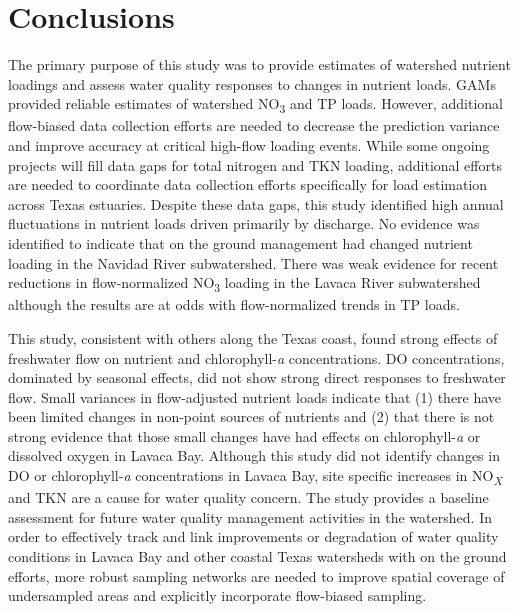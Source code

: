 \documentclass[fleqn,10pt,lineno]{wlpeerj} %
\providecommand{\DIFaddtex}[1]{{\protect\color{blue}\uwave{#1}}} %
\providecommand{\DIFaddbegin}{} %
\providecommand{\DIFaddend}{} %
\providecommand{\DIFadd}[1]{\texorpdfstring{\DIFaddtex{#1}}{#1}} %
\begin{document}
\hypertarget{conclusions}{%
\section*{Conclusions}\label{conclusions}}

The primary purpose of this study was to provide estimates of watershed
nutrient loadings and assess water quality responses to changes in
nutrient loads. GAMs provided reliable estimates of watershed
NO\textsubscript{3} and TP loads. However, additional flow-biased data
collection efforts are needed to decrease the prediction variance and
improve accuracy at critical high-flow loading events. While some
ongoing projects will fill data gaps for total nitrogen and TKN loading,
additional efforts are needed to coordinate data collection efforts
specifically for load estimation across Texas estuaries. Despite these
data gaps, this study identified high annual fluctuations in nutrient
loads driven primarily by discharge. No evidence was identified to
indicate that on the ground management had changed nutrient loading in
the Navidad River subwatershed. There was weak evidence for recent
reductions in flow-normalized NO\textsubscript{3} loading in the Lavaca
River subwatershed although the results are at odds with flow-normalized
trends in TP loads.

This study, consistent with others along the Texas coast, found strong
effects of freshwater flow on nutrient and chlorophyll-\emph{a}
concentrations. DO concentrations, dominated by seasonal effects, did
not show strong direct responses to freshwater flow. Small variances in
flow-adjusted nutrient loads indicate that (1) there have been limited
changes in non-point sources of nutrients and (2) that there is not
strong evidence that those small changes have had \DIFaddbegin \DIFadd{extensive }\DIFaddend effects on
chlorophyll-\emph{a} or dissolved oxygen in Lavaca Bay. Although this
study did not identify changes in DO or chlorophyll-\emph{a}
concentrations in Lavaca Bay, site specific increases in
NO\textsubscript{\emph{X}} and TKN are a cause for water quality
concern. The study provides a baseline assessment for future water
quality management activities in the watershed. In order to effectively
track and link improvements or degradation of water quality conditions
in Lavaca Bay and other coastal Texas watersheds with on the ground
efforts, more robust sampling networks are needed to improve spatial
coverage of undersampled areas and explicitly incorporate flow-biased
sampling.
\end{document}
